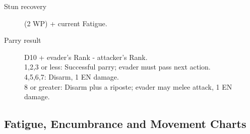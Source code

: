 \documentclass[twoside,a4paper]{article}
\begin{document}
{\begin{minipage}{\linewidth}
\begin{multicols}{2}
\begin{description}
\item[Stun recovery] (2 \x WP) + current Fatigue.

\item[Parry result] D10 + evader's Rank - attacker's Rank. \\
1,2,3 or less: Successful parry; evader must pass next action. \\
4,5,6,7: Disarm, 1 EN damage. \\
8 or greater: Disarm plus a riposte; evader may melee attack, 1 EN damage. \\
\end{description}
\end{multicols}
\end{minipage}}

\subsection{Fatigue, Encumbrance and Movement Charts}
\label{tables:encumbrance}
\label{tables:tmr}
\end{document}
